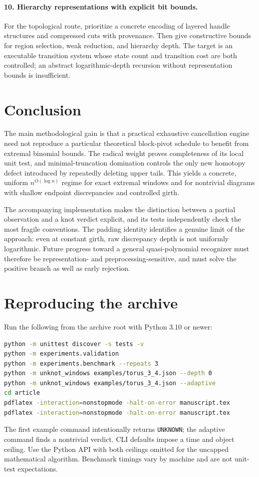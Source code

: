 \documentclass[11pt]{article}
\theoremstyle{definition}\newtheorem{definition}[theorem]{Definition}
\theoremstyle{remark}\newtheorem{remark}[theorem]{Remark}
\begin{document}
\paragraph{10. Hierarchy representations with explicit bit bounds.}
For the topological route, prioritize a concrete encoding of layered handle structures and compressed cuts with provenance. Then give constructive bounds for region selection, weak reduction, and hierarchy depth. The target is an executable transition system whose state count and transition cost are both controlled; an abstract logarithmic-depth recursion without representation bounds is insufficient.

\section{Conclusion}
The main methodological gain is that a practical exhaustive cancellation engine need not reproduce a particular theoretical block-pivot schedule to benefit from extremal binomial bounds. The radical weight proves completeness of its local unit test, and minimal-truncation domination controls the only new homotopy defect introduced by repeatedly deleting upper tails. This yields a concrete, uniform $n^{O(\log n)}$ regime for exact extremal windows and for nontrivial diagrams with shallow endpoint discrepancies and controlled girth.

The accompanying implementation makes the distinction between a partial observation and a knot verdict explicit, and its tests independently check the most fragile conventions. The padding identity identifies a genuine limit of the approach: even at constant girth, raw discrepancy depth is not uniformly logarithmic. Future progress toward a general quasi-polynomial recognizer must therefore be representation- and preprocessing-sensitive, and must solve the positive branch as well as early rejection.

\appendix
\section{Reproducing the archive}
Run the following from the archive root with Python 3.10 or newer:
\begin{lstlisting}[language=bash]
python -m unittest discover -s tests -v
python -m experiments.validation
python -m experiments.benchmark --repeats 3
python -m unknot_windows examples/torus_3_4.json --depth 0
python -m unknot_windows examples/torus_3_4.json --adaptive
cd article
pdflatex -interaction=nonstopmode -halt-on-error manuscript.tex
pdflatex -interaction=nonstopmode -halt-on-error manuscript.tex
\end{lstlisting}
The first example command intentionally returns \texttt{UNKNOWN}; the adaptive command finds a nontrivial verdict. CLI defaults impose a time and object ceiling. Use the Python API with both ceilings omitted for the uncapped mathematical algorithm. Benchmark timings vary by machine and are not unit-test expectations.
\end{document}
